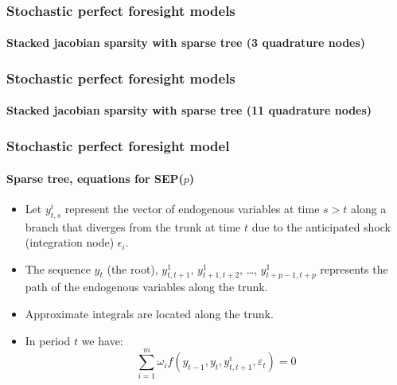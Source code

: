 \documentclass{beamer}
\begin{document}
\begin{frame}
   \frametitle{Stochastic perfect foresight models}
   \framesubtitle{Stacked jacobian sparsity with sparse tree (3 quadrature nodes)}
   \begin{center}
      \scalebox{.5}{
         }
   \end{center}

\end{frame}


\begin{frame}
   \frametitle{Stochastic perfect foresight models}
   \framesubtitle{Stacked jacobian sparsity with sparse tree (11 quadrature nodes)}
   \begin{center}
      \scalebox{.5}{
         }
   \end{center}

\end{frame}


\begin{frame}
   \frametitle{Stochastic perfect foresight model}
   \framesubtitle{Sparse tree, equations for SEP($p$)}

   \begin{itemize}

      \item Let $y_{t,s}^i$ represent the vector of endogenous variables
            at time $s>t$ along a branch that diverges from the trunk at
            time $t$ due to the anticipated shock (integration
            node) $\epsilon_i$.\newline

      \item The sequence $y_t$ (the
            root), $y_{t,t+1}^1$, $y_{t+1,t+2}^1$,
            \dots, $y_{t+p-1,t+p}^1$ represents the path of the
            endogenous variables along the trunk.\newline

      \item Approximate integrals are located along the trunk.\newline

      \item In period $t$ we have:
            \[
               \sum_{i=1}^m\omega_i f\left( y_{t-1}, y_t, y_{t, t+1}^i, \varepsilon_t \right) = 0
            \]

   \end{itemize}

\end{frame}
\end{document}
